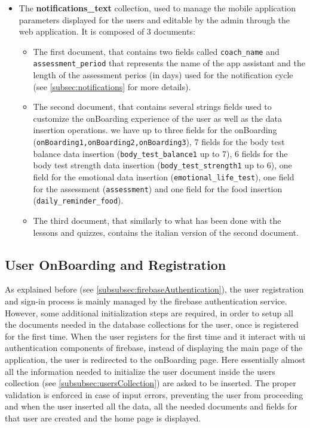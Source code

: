 \begin{itemize}[nosep] %
    \item The \textbf{notifications\_text} collection, used to manage the mobile application parameters displayed for the users and editable by the admin through the web application. It is composed of 3 documents:
    \begin{itemize}[nosep]
        \item The first document, that contains two fields called \texttt{coach\_name} and \newline \texttt{assessment\_period} that represents the name of the app assistant and the length of the assessment perios (in days) used for the notification cycle (see \cref{subsec:notifications} for more details).
        \item The second document, that contains several strings fields used to customize the onBoarding experience of the user as well as the data insertion operations. we have up to three fields for the onBoarding (\texttt{onBoarding1,onBoarding2,onBoarding3}), 7 fields for the body test balance data insertion (\texttt{body\_test\_balance1} up to 7), 6 fields for the body test strength data insertion (\texttt{body\_test\_strength1} up to 6), one field for the emotional data insertion (\texttt{emotional\_life\_test}), one field for the assessment (\texttt{assessment}) and one field for the food insertion (\texttt{daily\_reminder\_food}).
        \item The third document, that similarly to what has been done with the lessons and quizzes, contains the italian version of the second document.
    \end{itemize}
\end{itemize}
\newpage
\subsection{User OnBoarding and Registration}
As explained before (see \cref{subsubsec:firebaseAuthentication}), the user registration and sign-in process is mainly managed by the firebase authentication service. However, some additional initialization steps are required, in order to setup all the documents needed in the database collections for the user, once is registered for the first time. When the user registers for the first time and it interact with ui authentication components of firebase, instead of displaying the main page of the application, the user is redirected to the onBoarding page. Here essentially almost all the information needed to initialize the user document inside the users collection (see \cref{subsubsec:usersCollection}) are asked to be inserted. The proper validation is enforced in case of input errors, preventing the user from proceeding and when the user inserted all the data, all the needed documents and fields for that user are created and the home page is displayed. 


